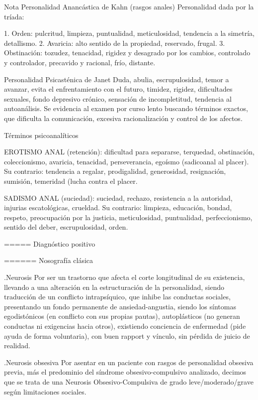 \documentclass[encares.tex]{subfiles}
\begin{document}
Nota Personalidad Anancástica de Kahn (rasgos anales) Personalidad dada por la tríada:

1. Orden: pulcritud, limpieza, puntualidad, meticulosidad, tendencia a la simetría, detallismo.
2. Avaricia: alto sentido de la propiedad, reservado, frugal.
3. Obstinación: tozudez, tenacidad, rigidez y desagrado por los cambios, controlado y controlador, precavido y racional, frío, distante.

Personalidad Psicasténica de Janet Duda, abulia, escrupulosidad, temor a avanzar, evita el enfrentamiento con el futuro, timidez, rigidez, dificultades sexuales, fondo depresivo crónico, sensación de incompletitud, tendencia al autoanálisis. Se evidencia al examen por curso lento buscando términos exactos, que dificulta la comunicación, excesiva racionalización y control de los afectos.

Términos psicoanalíticos

EROTISMO ANAL (retención): dificultad para separarse, terquedad, obstinación, coleccionismo, avaricia, tenacidad, perseverancia, egoísmo (sadicoanal al placer). Su contrario: tendencia a regalar, prodigalidad, generosidad, resignación, sumisión, temeridad (lucha contra el placer.

SADISMO ANAL (suciedad): suciedad, rechazo, resistencia a la autoridad, injurias escatológicas, crueldad. Su contrario: limpieza, educación, bondad, respeto, preocupación por la justicia, meticulosidad, puntualidad, perfeccionismo, sentido del deber, escrupulosidad, orden.

===== Diagnóstico positivo

====== Nosografía clásica

.Neurosis
Por ser un trastorno que afecta el corte longitudinal de su existencia, llevando a una alteración en la estructuración de la personalidad, siendo traducción de un conflicto intrapsíquico, que inhibe las conductas sociales, presentando un fondo permanente de ansiedad-angustia, siendo los síntomas egodistónicos (en conflicto con sus propias pautas), autoplásticos (no generan conductas ni exigencias hacia otros), existiendo conciencia de enfermedad (pide ayuda de forma voluntaria), con buen rapport y vínculo, sin pérdida de juicio de realidad.

.Neurosis obsesiva
Por asentar en un paciente con rasgos de personalidad obsesiva previa, más el predominio del síndrome obsesivo-compulsivo analizado, decimos que se trata de una Neurosis Obsesivo-Compulsiva de grado leve/moderado/grave según limitaciones sociales.
\end{document}
